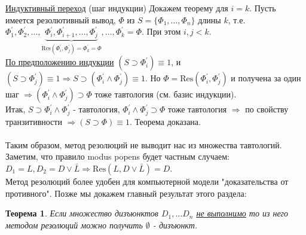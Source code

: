 \documentclass{article}
\newtheorem{theorem}{Теорема}
\numberwithin{example}{section}
\numberwithin{question}{section}
\numberwithin{Remark}{section}
\numberwithin{theorem}{section}
\numberwithin{definition}{section}
\numberwithin{proposition}{section}
\begin{document}
\underline{Индуктивный переход} (шаг индукции) Докажем теорему для $i=k$. Пусть имеется резолютивный вывод, $\Phi$ из $S=\{\Phi_1,\ldots,\Phi_n \}$ длины $k$, т.е.\\
$\Phi_1^{'},\Phi_2^{'},\ldots,\underbrace{\Phi_i^{'},\Phi_{i+1}^{'},\ldots,\Phi_j^{'}}_{\mathrm{Res}(\Phi_i^{'},\Phi_j^{'})=\Phi_k^{'}=\Phi},\ldots,\Phi_k^{'}=\Phi$. При этом $i,j<k$.\\
\underline{По предположению индукции} $(S\supset \Phi_i^{'})\equiv 1$, и $(S\supset \Phi_j^{'})\equiv 1\Rightarrow S\supset(\Phi_i^{'}\wedge \Phi_j^{'})\equiv 1$. Но $\Phi=\mathrm{Res}(\Phi_i^{'},\Phi_j^{'})$ и получена за один шаг $\Rightarrow(\Phi_i^{'}\wedge \Phi_j^{'})\supset \Phi$ тоже тавтология (см. базис индукции).\\
Итак, $S\supset \Phi_i^{'}\wedge \Phi_j^{'}$ - тавтология, $\Phi_i^{'}\wedge \Phi_j^{'}\supset\Phi$ тоже тавтология $\Rightarrow$ по свойству транзитивности $\Rightarrow(S\supset\Phi)\equiv 1$. Теорема доказана.\\
\\
Таким образом, метод резолюций не выводит нас из множества тавтологий. Заметим, что правило modus popens будет частным случаем: $D_1=L,D_2=D\vee \bar{L}\Rightarrow\mathrm{Res}(L,D\vee\bar{L})=D$.\\
Метод резолюций более удобен для компьютерной модели "доказательства от противного". Позже мы докажем главный результат этого раздела:
\begin{theorem}
Если множество дизъюнктов $D_1,\ldots D_n$ \underline{не выполнимо} то из него методом резолюций можно получить $\emptyset$ - дизъюнкт.
\end{theorem}
\end{document}

